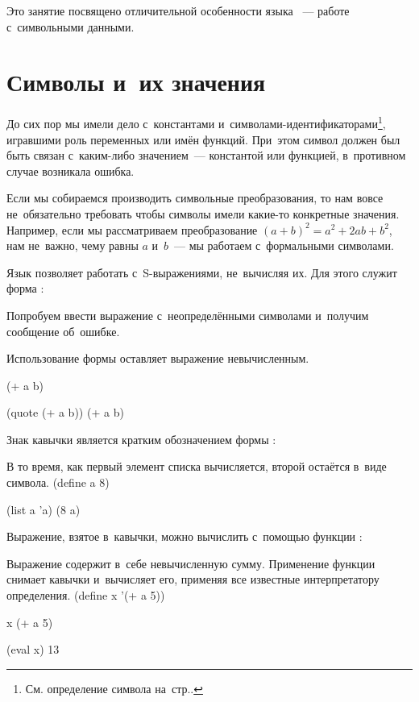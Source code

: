 \label{Less:symbols}

\begin{Abstract}
  Это занятие посвящено отличительной особенности языка \Scheme~--- работе с~символьными данными.
\end{Abstract}


\section{Символы и~их значения}%
До сих пор мы имели дело с~константами и~символами-идентификаторами\footnote{См. определение символа на~стр.\pageref{symbol}.}, игравшими роль переменных или имён функций. При~этом символ должен был быть связан с~каким-либо значением~--- константой или функцией, в~противном случае возникала ошибка.

Если мы собираемся производить символьные преобразования, то нам вовсе не~обязательно требовать чтобы символы имели какие-то конкретные значения. Например, если мы рассматриваем преобразование $(a + b)^2 = a^2 + 2ab + b^2$, нам не~важно, чему равны $a$ и~$b$~--- мы работаем с~формальными символами.

Язык \Scheme позволяет работать с~S-выражениями, не~вычисляя их. Для этого служит форма :

\begin{example}{Попробуем ввести выражение с~неопределёнными символами и~получим сообщение об~ошибке.

Использование формы  оставляет выражение невычисленным.}
\REPLin
  {(+ a b)}


\REPL
  {(quote (+ a b))}
  {(+ a b)}
\end{example}

Знак кавычки  является кратким обозначением формы :

\begin{example}{В то время, как первый элемент списка  вычисляется, второй остаётся в~виде символа.}
\REPLin
  {(define a 8)}

\REPL
  {(list a 'a)}
  {(8 a)}
\end{example}

Выражение, взятое в~кавычки, можно вычислить с~помощью функции :

\begin{example}{Выражение  содержит в~себе невычисленную сумму. Применение функции  снимает кавычки и~вычисляет его, применяя все известные интерпретатору определения.}
\REPLin
  {(define x '(+ a 5))}

\REPL
  {x}
  {(+ a 5)}

\REPL
  {(eval x)}
  {13}
\end{example}

